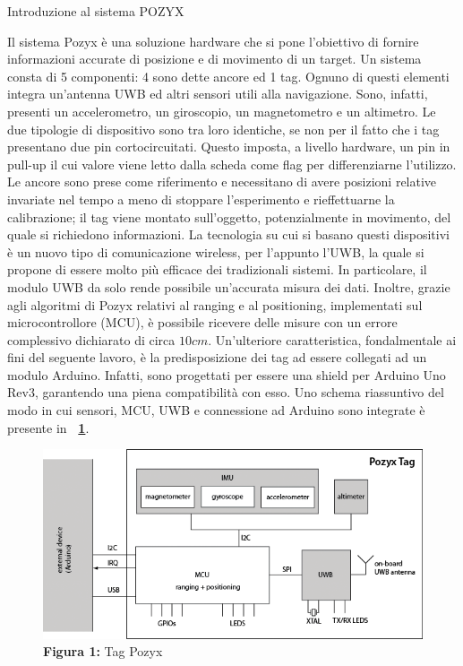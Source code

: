 \documentclass[12pt]{report}
\begin{document}
	\begin{section}{Introduzione al sistema POZYX}

		Il sistema Pozyx è una soluzione hardware che si pone l'obiettivo di fornire informazioni accurate di posizione e di movimento di un target. Un sistema consta di 5 componenti: 4 sono dette ancore ed 1 tag. Ognuno di questi elementi integra un’antenna UWB ed altri sensori utili alla 															navigazione. Sono, infatti, presenti un accelerometro, un giroscopio, un magnetometro e un altimetro. Le due tipologie di dispositivo sono tra loro identiche, se non per il fatto che i tag presentano due pin cortocircuitati. Questo imposta, a livello hardware, un pin in pull-up il cui valore viene letto dalla scheda come 			flag per differenziarne l’utilizzo. Le ancore sono prese come riferimento e necessitano di avere posizioni relative invariate nel tempo a meno di stoppare l’esperimento e rieffettuarne la calibrazione; il tag viene montato sull’oggetto, potenzialmente in movimento, del quale si richiedono informazioni. La tecnologia su 		cui si basano questi dispositivi è un nuovo tipo di comunicazione wireless, per l'appunto l'UWB, la quale si propone di essere molto più efficace dei tradizionali sistemi. In particolare, il modulo UWB da solo rende possibile un'accurata misura dei dati. Inoltre, grazie agli algoritmi di Pozyx relativi al 	ranging e al 					positioning, implementati sul microcontrollore (MCU),  è possibile ricevere delle misure con un errore complessivo dichiarato di circa $10 cm$. Un'ulteriore caratteristica, fondalmentale ai fini del seguente lavoro, è la predisposizione dei tag ad essere collegati ad un modulo Arduino. Infatti, sono progettati per 					essere una shield per Arduino Uno Rev3, garantendo una piena compatibilità con esso. Uno schema riassuntivo del modo in cui sensori, MCU, UWB e connessione ad Arduino sono integrate è presente in \textbf{\figurename~\ref{Fsisttag}}.

		\begin{figure}[h]
			\centering
			\includegraphics[scale=0.5]{system_tag}
	 		\caption{\textbf{Figura 1:} Tag Pozyx}\label{Fsisttag}
		\end{figure}


\end{section}
\end{document}
